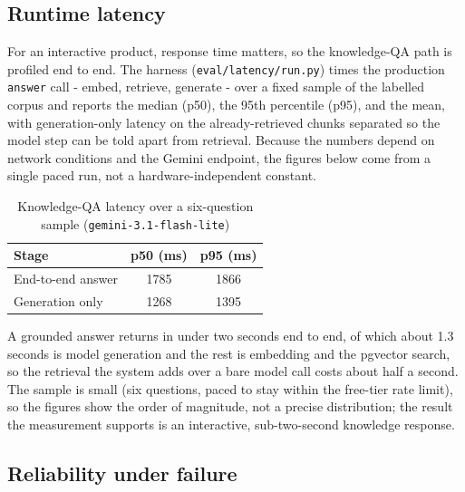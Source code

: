 \documentclass[../main.tex]{subfiles}
\begin{document}
\subsection{Runtime latency}
\label{subsection:4.4.4}

For an interactive product, response time matters, so the knowledge-QA path is profiled end to end.
The harness (\texttt{eval/latency/run.py}) times the production \texttt{answer} call - embed, retrieve, generate - over a fixed sample of the labelled corpus and reports the median (p50), the 95th percentile (p95), and the mean, with generation-only latency on the already-retrieved chunks separated so the model step can be told apart from retrieval.
Because the numbers depend on network conditions and the Gemini endpoint, the figures below come from a single paced run, not a hardware-independent constant.
\begin{table}[H]
    \centering
    \caption{Knowledge-QA latency over a six-question sample (\texttt{gemini-3.1-flash-lite})}
    \label{table:eval-latency}
    \begin{tabular}{|p{5cm}|c|c|}
        \hline
        \textbf{Stage} & \textbf{p50 (ms)} & \textbf{p95 (ms)} \\
        \hline
        End-to-end answer & 1785 & 1866 \\
        \hline
        Generation only & 1268 & 1395 \\
        \hline
    \end{tabular}
\end{table}

A grounded answer returns in under two seconds end to end, of which about 1.3 seconds is model generation and the rest is embedding and the pgvector search, so the retrieval the system adds over a bare model call costs about half a second.
The sample is small (six questions, paced to stay within the free-tier rate limit), so the figures show the order of magnitude, not a precise distribution; the result the measurement supports is an interactive, sub-two-second knowledge response.

\subsection{Reliability under failure}
\label{subsection:4.4.5}
\end{document}
